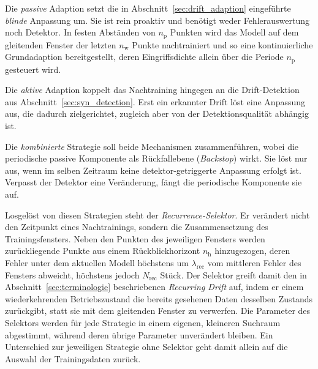 Die \emph{passive} Adaption setzt die in Abschnitt~\ref{sec:drift_adaption} eingeführte \emph{blinde} Anpassung um. Sie ist rein proaktiv und benötigt weder Fehlerauswertung noch Detektor. In festen Abständen von $n_{\mathrm{p}}$ Punkten wird das Modell auf dem gleitenden Fenster der letzten $n_{\mathrm{w}}$ Punkte nachtrainiert und so eine kontinuierliche Grundadaption bereitgestellt, deren Eingriffsdichte allein über die Periode $n_{\mathrm{p}}$ gesteuert wird. \par
%
Die \emph{aktive} Adaption koppelt das Nachtraining hingegen an die Drift-Detektion aus Abschnitt~\ref{sec:syn_detection}. Erst ein erkannter Drift löst eine Anpassung aus, die dadurch zielgerichtet, zugleich aber von der Detektionsqualität abhängig ist. \par
%
Die \emph{kombinierte} Strategie soll beide Mechanismen zusammenführen, wobei die periodische passive Komponente als Rückfallebene (\emph{Backstop}) wirkt. Sie löst nur aus, wenn im selben Zeitraum keine detektor-getriggerte Anpassung erfolgt ist. Verpasst der Detektor eine Veränderung, fängt die periodische Komponente sie auf. \par
%
Losgelöst von diesen Strategien steht der \emph{Recurrence-Selektor}. Er verändert nicht den Zeitpunkt eines Nachtrainings, sondern die Zusammensetzung des Trainingsfensters. Neben den Punkten des jeweiligen Fensters werden zurückliegende Punkte aus einem Rückblickhorizont $n_{\mathrm{h}}$ hinzugezogen, deren Fehler unter dem aktuellen Modell höchstens um $\lambda_{\mathrm{rec}}$ vom mittleren Fehler des Fensters abweicht, höchstens jedoch $N_{\mathrm{rec}}$ Stück. Der Selektor greift damit den in Abschnitt~\ref{sec:terminologie} beschriebenen \emph{Recurring Drift} auf, indem er einem wiederkehrenden Betriebszustand die bereits gesehenen Daten desselben Zustands zurückgibt, statt sie mit dem gleitenden Fenster zu verwerfen. Die Parameter des Selektors werden für jede Strategie in einem eigenen, kleineren Suchraum abgestimmt, während deren übrige Parameter unverändert bleiben. Ein Unterschied zur jeweiligen Strategie ohne Selektor geht damit allein auf die Auswahl der Trainingsdaten zurück. \par
